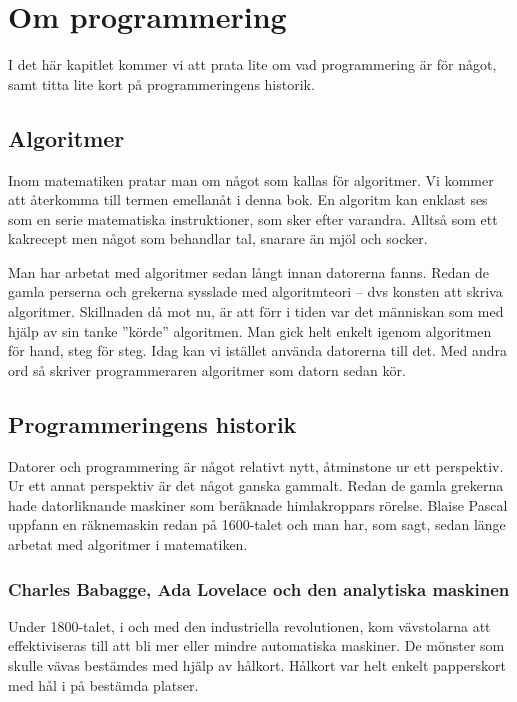 %
%

\chapter{Om programmering}\label{ch:omprog}
I det här kapitlet kommer vi att prata lite om vad programmering är för något, samt titta lite kort på programmeringens historik.

\section{Algoritmer}\label{subsec:algoritmer1}
Inom matematiken pratar man om något som kallas för algoritmer. Vi kommer att återkomma till termen emellanåt i denna bok. En algoritm kan enklast ses som en serie matematiska instruktioner, som sker efter varandra. Alltså som ett kakrecept men något som behandlar tal, snarare än mjöl och socker.

Man har arbetat med algoritmer sedan långt innan datorerna fanns. Redan de gamla perserna och grekerna sysslade med algoritmteori – dvs konsten att skriva algoritmer. Skillnaden då mot nu, är att förr i tiden var det människan som med hjälp av sin tanke ''körde'' algoritmen. Man gick helt enkelt igenom algoritmen för hand, steg för steg. Idag kan vi istället använda datorerna till det. Med andra ord så skriver programmeraren algoritmer som datorn sedan kör.

\section{Programmeringens historik}
Datorer och programmering är något relativt nytt, åtminstone ur ett perspektiv. Ur ett annat perspektiv är det något ganska gammalt. Redan de gamla grekerna hade datorliknande maskiner som beräknade himlakroppars rörelse. Blaise Pascal uppfann en räknemaskin redan på 1600-talet och man har, som sagt, sedan länge arbetat med algoritmer i matematiken.

\subsection{Charles Babagge, Ada Lovelace och den analytiska maskinen}
Under 1800-talet, i och med den industriella revolutionen, kom vävstolarna att effektiviseras till att bli mer eller mindre automatiska maskiner. De mönster som skulle vävas bestämdes med hjälp av hålkort. Hålkort var helt enkelt papperskort med hål i på bestämda platser.

